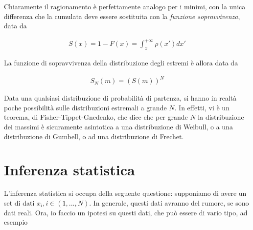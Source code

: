 \documentclass{report}
\begin{document}
Chiaramente il ragionamento è perfettamente analogo per i minimi, con la unica differenza che la cumulata deve essere sostituita con la \emph{funzione sopravvivenza}, data da 

\begin{align}
    S(x) = 1 - F(x) = \int_x^{+\infty} \rho(x')dx' 
\end{align}

La funzione di sopravvivenza della distribuzione degli estremi è allora data da 

\begin{align}
    S_N (m) = (S(m))^N
\end{align}


Data una qualsiasi distribuzione di probabilità di partenza, si hanno in realtà poche possibilità sulle distribuzioni estremali a grande \(N\). In effetti, vi è un teorema, di Fisher-Tippet-Gnedenko, che dice che per grande \(N\) la distribuzione dei massimi è sicuramente asintotica a una distribuzione di Weibull, o a una distribuzione di Gumbell, o ad una distribuzione di Frechet. 






\chapter{Inferenza statistica}

L'inferenza statistica si occupa della seguente questione: supponiamo di avere un set di dati \({x_i}, i \in (1, ..., N)\). In generale, questi dati avranno del rumore, se sono dati reali. Ora, io faccio un ipotesi su questi dati, che può essere di vario tipo, ad esempio
\end{document}
